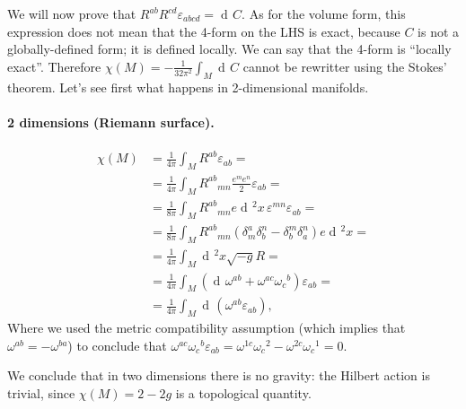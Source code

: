 \documentclass[a4paper,12pt]{book}
\newcommand{\dd}{\mathop{\mathrm{d}\!}{}}
\renewcommand{\epsilon}{\varepsilon}
\theoremstyle{definition}
\theoremstyle{remark}
\begin{document}
We will now prove that $R^{ab}R^{cd}\epsilon_{abcd}=\dd C$. As for the volume form, this expression does not mean that the 4-form on the LHS is exact, because $C$ is not a globally-defined form; it is defined locally. We can say that the 4-form is ``locally exact''. Therefore $\chi(M)=-\frac1{32\pi^2}\int_M\dd C$ cannot be rewritter using the Stokes' theorem. Let's see first what happens in 2-dimensional manifolds.
\paragraph{2 dimensions (Riemann surface).}
\begin{align*}
\chi(M)&=\frac1{4\pi}\int_MR^{ab}\epsilon_{ab}=\\
&=\frac1{4\pi}\int_MR^{ab}{}_{mn}\frac{e^me^n}{2}\epsilon_{ab}=\\
&=\frac1{8\pi}\int_MR^{ab}{}_{mn}e\dd^2x\,\epsilon^{mn}\epsilon_{ab}=\\
&=\frac1{8\pi}\int_MR^{ab}{}_{mn}(\delta^a_m\delta^n_b-\delta^m_b\delta^n_a)e\dd^2x=\\
&=\frac1{4\pi}\int_M\dd^2x\sqrt{-g}R=\\
&=\frac1{4\pi}\int_M(\dd\omega^{ab}+\omega^{ac}\omega_c{}^b)\epsilon_{ab}=\\
&=\frac1{4\pi}\int_M\dd(\omega^{ab}\epsilon_{ab}),
\end{align*}
Where we used the metric compatibility assumption (which implies that $\omega^{ab}=-\omega^{ba}$) to conclude that $\omega^{ac}\omega_c{}^b\epsilon_{ab}=\omega^{1c}\omega_c{}^2-\omega^{2c}\omega_c{}^1=0$.

We conclude that in two dimensions there is no gravity: the Hilbert action is trivial, since $\chi(M)=2-2g$ is a topological quantity.
\end{document}
